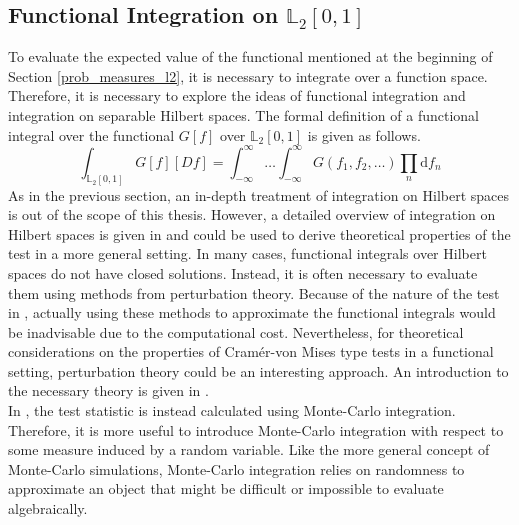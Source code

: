 \documentclass[12pt, a4paper]{article}
\theoremstyle{MAstyle} \newtheorem{assumption}{Assumption}[section]
\theoremstyle{MAstyle} \newtheorem{definition}{Definition}[section]
\theoremstyle{MAstyle} \newtheorem{theorem}{Theorem}[section]
\begin{document}
		\subsection{Functional Integration on $\mathbb{L}_2[0,1]$}\label{Integration}
			To evaluate the expected value of the functional mentioned at the beginning of Section \ref{prob_measures_l2}, it is necessary to integrate over a function space. Therefore, it is necessary to explore the ideas of functional integration and integration on separable Hilbert spaces. 
			The formal definition of a functional integral over the functional $G[f]$ over $\mathbb{L}_2[0,1]$ is given as follows. 
			\begin{equation}
				\int_{\mathbb{L}_2[0,1]} G\left[f\right] \left[Df\right] = \int_{-\infty}^{\infty}\dots\int_{-\infty}^{\infty} G\left(f_1, f_2, \dots\right) \prod_{n} \mathrm{d}f_n
			\end{equation}
			As in the previous section, an in-depth treatment of integration on Hilbert spaces is out of the scope of this thesis. However, a detailed overview of integration on Hilbert spaces is given in \cite{skorohod_integration_1974} and could be used to derive theoretical properties of the test in a more general setting. In many cases, functional integrals over Hilbert spaces do not have closed solutions. Instead, it is often necessary to evaluate them using methods from perturbation theory. Because of the nature of the test in \cite{bugni_permutation_2021}, actually using these methods to approximate the functional integrals would be inadvisable due to the computational cost. Nevertheless, for theoretical considerations on the properties of Cram\'{e}r-von Mises type tests in a functional setting, perturbation theory could be an interesting approach. An introduction to the necessary theory is given in \cite{jeribi_perturbation_2021}.\\
			
			In \cite{bugni_permutation_2021}, the test statistic is instead calculated using Monte-Carlo integration. Therefore, it is more useful to introduce Monte-Carlo integration with respect to some measure induced by a random variable. Like the more general concept of Monte-Carlo simulations, Monte-Carlo integration relies on randomness to approximate an object that might be difficult or impossible to evaluate algebraically. 
			
\end{document}
